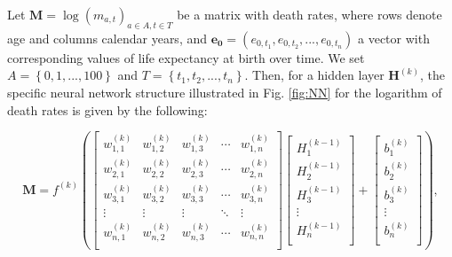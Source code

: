 \documentclass[a4,11pt]{article}
\begin{document}
Let $\mathbf{M}=\log(m_{a,t})_{a\in A,t\in T}$ be a matrix with death rates, where rows denote age and columns calendar years, and $\mathbf{e_{0}}=(e_{0,t_1},e_{0,t_2},...,e_{0,t_n})$ a vector with corresponding values of life expectancy at birth over time. We set $A=\left\{0,1,...,100\right\}$ and $T=\left\{t_1,t_2,...,t_n\right\}$. Then, for a hidden layer $\mathbf{H}^{(k)}$, the specific neural network structure illustrated in Fig. \ref{fig:NN} for the logarithm of death rates is given by the following:

%
\begin{equation}
\mathbf{M} =
f^{(k)} \left(
\begin{bmatrix}
w^{(k)}_{1,1} & w^{(k)}_{1,2} &w^{(k)}_{1,3} & \cdots & w^{(k)}_{1,n} \\
w^{(k)}_{2,1} & w^{(k)}_{2,2} &w^{(k)}_{2,3} & \cdots & w^{(k)}_{2,n} \\
w^{(k)}_{3,1} & w^{(k)}_{3,2} &w^{(k)}_{3,3} & \cdots & w^{(k)}_{3,n} \\
\vdots & \vdots & \vdots & \ddots & \vdots \\
w^{(k)}_{n,1} & w^{(k)}_{n,2} &w^{(k)}_{n,3} & \cdots & w^{(k)}_{n,n} \\
\end{bmatrix}
\begin{bmatrix}
H^{(k-1)}_{1} \\
H^{(k-1)}_{2} \\
H^{(k-1)}_{3} \\
\vdots   \\
H^{(k-1)}_{n} \\
\end{bmatrix}
+
\begin{bmatrix}
b^{(k)}_{1}\\
b^{(k)}_{2} \\
b^{(k)}_{3} \\
\vdots   \\
b^{(k)}_{n} \\
\end{bmatrix}
\right),
\label{eq:1}
\end{equation}
%
\end{document}

